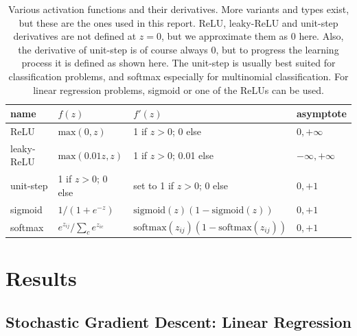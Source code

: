 \documentclass[]{article}
\begin{document}
\begin{table}[!ht]
	\caption{Various activation functions and their derivatives. More variants and types exist, but these are the ones used in this report. ReLU, leaky-ReLU and unit-step derivatives are not defined at $z=0$, but we approximate them as 0 here. Also, the derivative of unit-step is of course always 0, but to progress the learning process it is defined as shown here. The unit-step is usually best suited for classification problems, and softmax especially for multinomial classification. For linear regression problems, sigmoid or one of the ReLUs can be used.}
	\label{tab:activation-funcs}
	\begin{center}
		\begin{tabular}{l|l|l|l}
			\toprule
			name&	$f(z)$&	$f'(z)$&	asymptote \\
			\midrule
			ReLU&	$\mathrm{max}(0,z)$&	1 if $z > 0$; 0 else&	$0,+\infty$ \\
			leaky-ReLU&	$\mathrm{max}(0.01z,z)$&	1 if $z > 0$; 0.01 else&	$-\infty,+\infty$ \\
			unit-step&	1 if $z > 0$; 0 else&	set to 1 if $z > 0$; 0 else&	$0,+1$ \\
			sigmoid&	$1/(1 + e^{-z})$&	$\mathrm{sigmoid}(z)(1 - \mathrm{sigmoid}(z))$	&	$0,+1$ \\
			softmax&	$e^{z_{ij}}/\sum_{c}e^{z_{ic}}$&	$\mathrm{softmax}(z_{ij})(1 - \mathrm{softmax}(z_{ij}))$ &	$0,+1$ \\
			\bottomrule
		\end{tabular}
	\end{center}
\end{table}


\clearpage
\section{Results} \label{results}

\subsection{Stochastic Gradient Descent: Linear Regression}
\end{document}
